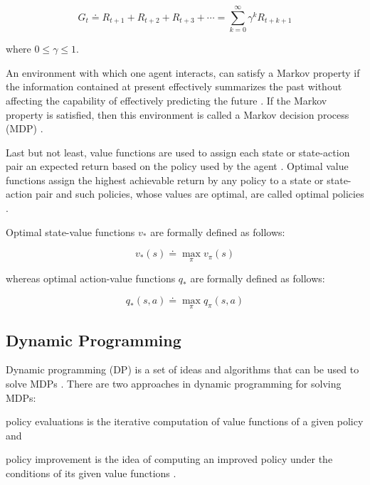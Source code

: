 \documentclass{seal_thesis}
\begin{document}
\begin{equation}
\label{eq:expected_discounted_return}
	G_t  \doteq R_{t+1} + R_{t+2} + R_{t+3} + \cdots = \sum_{k=0}^\infty \gamma^k R_{t+k+1}
\end{equation}

where $0 \leq \gamma \leq 1$.

An environment  with which one agent interacts, can satisfy a Markov property if the information contained at present effectively summarizes the past without affecting the capability of effectively predicting the future \cite[p. 73]{Sutton2017}. If the Markov property is satisfied, then this environment is called a Markov decision process (MDP) \cite[p. 73]{Sutton2017}.

Last but not least, value functions are used to assign each state or state-action pair an expected return based on the policy used by the agent \cite[p. 74]{Sutton2017}. Optimal value functions assign the highest achievable return by any policy to a state or state-action pair  and such policies, whose values are optimal, are called optimal policies \cite[p. 74]{Sutton2017}.

Optimal state-value functions $v_*$ are formally defined as follows:

\begin{equation}
	v_* (s) \doteq \max_\pi v_\pi (s)
\end{equation}

whereas optimal action-value functions $q_*$ are formally defined as follows:

\begin{equation}
	q_* (s,a) \doteq \max_\pi q_\pi (s,a)
\end{equation}

\subsection{Dynamic Programming}
\label{subsec:dp}

Dynamic programming (DP) is a set of ideas and algorithms that can be used to solve MDPs \cite[p. 95]{Sutton2017}. There are two approaches in dynamic programming for solving MDPs:
\begin{enumerate*}
	\item policy evaluations is the iterative computation of value functions of a given policy and
	\item policy improvement is the idea of computing an improved policy under the conditions of its given value functions \cite[p. 95]{Sutton2017}.
\end{enumerate*}
\end{document}
